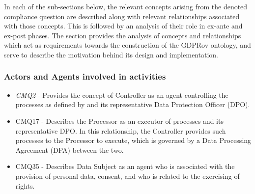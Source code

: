 In each of the sub-sections below, the relevant concepts arising from the denoted compliance question are described along with relevant relationships associated with those concepts. This is followed by an analysis of their role in ex-ante and ex-post phases. The section provides the analysis of concepts and relationships which act as requirements towards the construction of the GDPRov ontology, and serve to describe the motivation behind its design and implementation.

\subsubsection{Actors and Agents involved in activities}
\begin{itemize} 
    \item \textit{CMQ2} - Provides the concept of Controller as an agent controlling the processes as defined by and its representative Data Protection Officer (DPO).
    \item CMQ17 - Describes the Processor as an executor of processes and its representative DPO. In this relationship, the Controller provides such processes to the Processor to execute, which is governed by a Data Processing Agreement (DPA) between the two.
    \item CMQ35 - Describes Data Subject as an agent who is associated with the provision of personal data, consent, and who is related to the exercising of rights.
\end{itemize}

